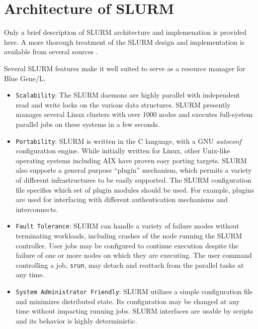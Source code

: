 \documentclass[10pt,onecolumn,times]{../common/llncs}
\begin{document}
{\section{Architecture of SLURM}

Only a brief description of SLURM architecture and implemenation is provided
here.
A more thorough treatment of the SLURM design and implementation is
available from several sources \cite{SLURM2003,SlurmWeb}.

Several SLURM features make it well suited to serve as a resource manager
for Blue Gene/L.

\begin{itemize}

\item {\tt Scalability}:
The SLURM daemons are highly parallel  with independent read and write
locks on the various data structures.
SLURM presently manages several Linux clusters with over 1000 nodes
and executes full-system parallel jobs on these systems in a few seconds.

\item {\tt Portability}:
SLURM is written in the C language, with a GNU {\em autoconf} configuration engine.
While initially written for Linux, other Unix-like operating systems including
AIX have proven easy porting targets.
SLURM also supports a general purpose ``plugin'' mechanism, which
permits a variety of different infrastructures to be easily supported.
The SLURM configuration file specifies which set of plugin modules
should be used.
For example, plugins are used for interfacing with different authentication
mechanisms and interconnects.

\item {\tt Fault Tolerance}: SLURM can handle a variety of failure
modes without terminating workloads, including crashes of the node
running the SLURM controller.  User jobs may be configured to continue
execution despite the failure of one or more nodes on which they are
executing.  The user command controlling a job, {\tt srun}, may detach
and reattach from the parallel tasks at any time.

\item {\tt System Administrator Friendly}: SLURM utilizes
a simple configuration file and minimizes distributed state.
Its configuration may be changed at any time without impacting running
jobs.  SLURM interfaces are usable by scripts and its behavior is
highly deterministic.

\end{itemize}

}
\end{document}
